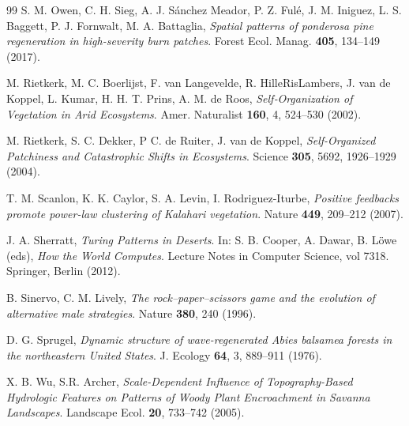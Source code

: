 \documentclass[12pt]{amsart}
\numberwithin{equation}{section}
\begin{document}
\begin{thebibliography}{99}
S. M. Owen, C. H. Sieg, A. J. S\'anchez Meador, P. Z. Ful\'e, J. M. Iniguez, L. S. Baggett,
P. J. Fornwalt, 
M. A. Battaglia, {\em Spatial patterns of ponderosa pine regeneration in high-severity burn patches}. Forest Ecol. Manag. {\bf 405}, 134--149 (2017).

M. Rietkerk, M. C. Boerlijst, F. van Langevelde, R. HilleRisLambers, J. van de Koppel, L. Kumar, H. H. T. Prins, A. M. de Roos,
{\em Self‐Organization of Vegetation in Arid Ecosystems}.
Amer. Naturalist {\bf 160}, 4, 524--530 (2002).

M. Rietkerk, S. C. Dekker, P C. de Ruiter, J.
van de Koppel, {\em Self-Organized Patchiness and Catastrophic Shifts in Ecosystems}.
Science {\bf 305}, 5692,
1926--1929 (2004).

T. M. Scanlon, K. K. Caylor, S. A. Levin, I. Rodriguez-Iturbe,
{\em Positive feedbacks promote power-law clustering of Kalahari vegetation}. 
Nature {\bf 449}, 209--212 (2007).

 J. A.
Sherratt, {\em Turing Patterns in Deserts}. In: S. B. Cooper, A. Dawar, B. L\"owe (eds), {\em
How the World Computes}. Lecture Notes in Computer Science, vol 7318. Springer, Berlin (2012).

B. Sinervo, C. M. Lively, {\em The rock--paper--scissors game and the
evolution of alternative male strategies}. Nature {\bf 380}, 240 (1996).

D. G. Sprugel, {\em
Dynamic structure of wave-regenerated Abies balsamea forests in the northeastern United States}. J. Ecology {\bf 64}, 3, 889--911 (1976).

X. B. Wu, S.R. Archer, {\em
Scale-Dependent Influence of Topography-Based Hydrologic Features on Patterns of Woody Plant Encroachment in Savanna Landscapes}. Landscape Ecol. {\bf 20}, 733--742 (2005).
\end{thebibliography}
\end{document}
